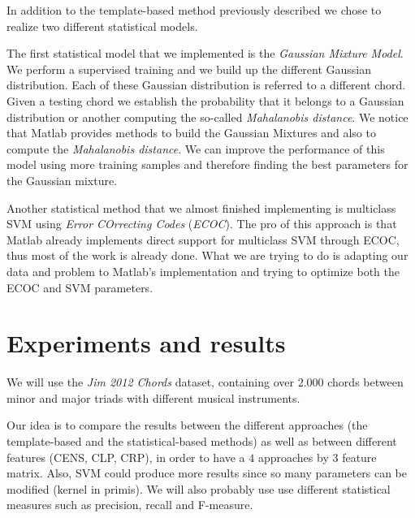 \documentclass[a4paper]{article}
\begin{document}
In addition to the template-based method previously described we chose to realize two different statistical models.

The first statistical model that we implemented is the \textit{Gaussian Mixture Model}. We perform a supervised training and we build up the different Gaussian distribution. Each of these Gaussian distribution is referred to a different chord. Given a testing chord we establish the probability that it belongs to a Gaussian distribution or another computing the so-called \textit{Mahalanobis distance}. We notice that Matlab provides methods to build the Gaussian Mixtures and also to compute the \textit{Mahalanobis distance}. We can improve the performance of this model using more training samples and therefore finding the best parameters for the Gaussian mixture.

Another statistical method that we almost finished implementing is multiclass SVM using \textit{Error COrrecting Codes} (\textit{ECOC}). The pro of this approach is that Matlab already implements direct support for multiclass SVM through ECOC, thus most of the work is already done. What we are trying to do is adapting our data and problem to Matlab's implementation and trying to optimize both the ECOC and SVM parameters.

\section{Experiments and results}
We will use the \textit{Jim 2012 Chords} \cite{jim2012chords} dataset, containing over $2.000$ chords between minor and major triads with different musical instruments.

Our idea is to compare the results between the different approaches (the template-based and the statistical-based methods) as well as between different features (CENS, CLP, CRP), in order to have a $4$ approaches by $3$ feature matrix. Also, SVM could produce more results since so many parameters can be modified (kernel in primis). We will also probably use use different statistical measures such as precision, recall and F-measure.



\end{document}
